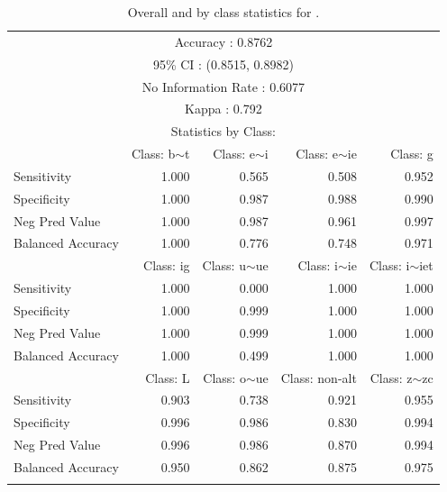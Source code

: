 \begin{table}[!htpb]
  \centering
  \begin{tabular}{lrrrr}
    \lsptoprule
    \multicolumn{5}{c}{Overall Statistics}           \\
    \midrule
    \multicolumn{5}{c}{Accuracy : 0.8762}            \\
    \multicolumn{5}{c}{95\% CI : (0.8515, 0.8982)}   \\
    \multicolumn{5}{c}{No Information Rate : 0.6077} \\
    \multicolumn{5}{c}{Kappa : 0.792}                \\
    \midrule
    \multicolumn{5}{c}{Statistics by Class:}         \\
    \midrule

 & Class: b$\sim$t & Class: e$\sim$i  & Class: e$\sim$ie    & Class: g     \\

    Sensitivity       & 1.000     & 0.565            & 0.508            & 0.952             \\
    Specificity       & 1.000     & 0.987            & 0.988            & 0.990             \\
    Neg Pred Value    & 1.000     & 0.987            & 0.961            & 0.997             \\
    Balanced Accuracy & 1.000     & 0.776            & 0.748            & 0.971             \\
                      & Class: ig & Class: u$\sim$ue & Class: i$\sim$ie & Class: i$\sim$iet \\
    Sensitivity       & 1.000     & 0.000            & 1.000            & 1.000             \\
    Specificity       & 1.000     & 0.999            & 1.000            & 1.000             \\
    Neg Pred Value    & 1.000     & 0.999            & 1.000            & 1.000             \\
    Balanced Accuracy & 1.000     & 0.499            & 1.000            & 1.000             \\

 & Class: L  & Class: o$\sim$ue & Class: non-alt   & Class: z$\sim$zc  \\

    Sensitivity       & 0.903     & 0.738            & 0.921            & 0.955             \\
    Specificity       & 0.996     & 0.986            & 0.830            & 0.994             \\
    Neg Pred Value    & 0.996     & 0.986            & 0.870            & 0.994             \\
    Balanced Accuracy & 0.950     & 0.862            & 0.875            & 0.975             \\
    \lspbottomrule
  \end{tabular}
  \caption{Overall and by class statistics for .}
  \label{tab:spanish-verbs-minor-v-stats}
\end{table}

